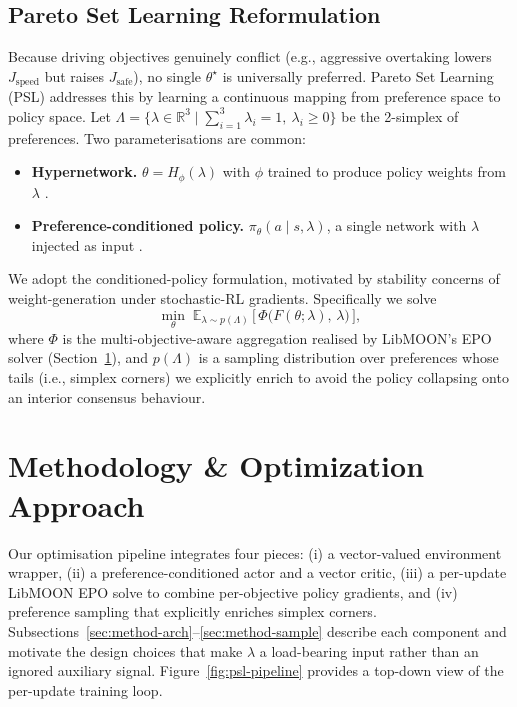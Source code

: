 \documentclass[12pt, letterpaper]{article}
\begin{document}
\subsection{Pareto Set Learning Reformulation}
Because driving objectives genuinely conflict (e.g., aggressive overtaking lowers $J_{\text{speed}}$ but raises $J_{\text{safe}}$), no single $\theta^{\star}$ is universally preferred. Pareto Set Learning (PSL) \cite{navon2020learning,liu2025pareto} addresses this by learning a continuous mapping from preference space to policy space. Let $\Lambda = \{\lambda \in \mathbb{R}^3 \mid \sum_{i=1}^{3}\lambda_i = 1,\ \lambda_i \ge 0\}$ be the 2-simplex of preferences. Two parameterisations are common:
\begin{itemize}
    \item \textbf{Hypernetwork.} $\theta = H_\phi(\lambda)$ with $\phi$ trained to produce policy weights from $\lambda$ \cite{navon2020learning}.
    \item \textbf{Preference-conditioned policy.} $\pi_{\theta}(a \mid s, \lambda)$, a single network with $\lambda$ injected as input \cite{abels2019dynamic}.
\end{itemize}
We adopt the conditioned-policy formulation, motivated by stability concerns of weight-generation under stochastic-RL gradients. Specifically we solve
\begin{equation}
    \min_{\theta} \; \mathbb{E}_{\lambda \sim p(\Lambda)}\, \big[\, \Phi\big(F(\theta;\lambda),\,\lambda\big)\,\big],
\end{equation}
where $\Phi$ is the multi-objective-aware aggregation realised by LibMOON's \cite{zhang2024libmoon} EPO solver (Section~\ref{sec:methodology}), and $p(\Lambda)$ is a sampling distribution over preferences whose tails (i.e., simplex corners) we explicitly enrich to avoid the policy collapsing onto an interior consensus behaviour.

\section{Methodology \& Optimization Approach}
\label{sec:methodology}

Our optimisation pipeline integrates four pieces: (i) a vector-valued environment wrapper, (ii) a preference-conditioned actor and a vector critic, (iii) a per-update LibMOON EPO solve to combine per-objective policy gradients, and (iv) preference sampling that explicitly enriches simplex corners. Subsections~\ref{sec:method-arch}--\ref{sec:method-sample} describe each component and motivate the design choices that make $\lambda$ a load-bearing input rather than an ignored auxiliary signal. Figure~\ref{fig:psl-pipeline} provides a top-down view of the per-update training loop.
\end{document}
